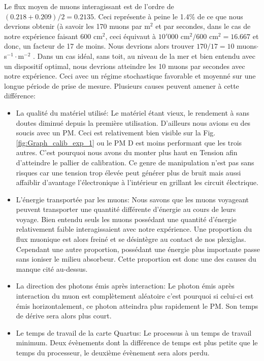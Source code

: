 \documentclass[12pt]{article}
\begin{document}
Le flux moyen de muons interagissant est de l'ordre de $(0.218+0.209)/2=0.2135$. Ceci représente à peine le 1.4\% de ce que nous devrions obtenir (à savoir les 170 muons par m$^2$ et par secondes, dans le cas de notre expérience faisant 600 cm$^{2}$, ceci équivaut à $10'000$ cm$^{2}/600$ cm$^{2}=16.667$ et donc, un facteur de 17 de moins. Nous devrions alors trouver $170/17=10$ muons$\cdot$ s$^{-1}\cdot $m$^{-2}$ . Dans un cas idéal, sans toit, au niveau de la mer et bien entendu avec un dispositif optimal, nous devrions atteindre les 10 muons par secondes avec notre expérience. Ceci avec un régime stochastique favorable et moyenné sur une longue période de prise de mesure. Plusieurs causes peuvent amener à cette différence: 

\begin{itemize}
    \item La qualité du matériel utilisé: Le matériel étant vieux, le rendement à sans doutes diminué depuis la première utilisation. D'ailleurs nous avions eu des soucis avec un PM. Ceci est relativement bien visible sur la Fig. \ref{fig:Graph_calib_exp_1} ou le PM D est moins performant que les trois autres. C'est pourquoi nous avons du monter plus haut en Tension afin d'atteindre le pallier de calibration. Ce genre de manipulation n'est pas sans risques car une tension trop élevée peut générer plus de bruit mais aussi affaiblir d'avantage l'électronique à l'intérieur en grillant les circuit électrique.
    
    \item L'énergie transportée par les muons: Nous savons que les muons voyageant peuvent transporter une quantité différente d'énergie au cours de leurs voyage. Bien entendu seuls les muons possédant une quantité d'énergie relativement faible interagissaient avec notre expérience. Une proportion du flux muonique est alors freiné et se désintègre au contact de nos plexiglas. Cependant une autre proportion, possédant une énergie plus importante passe sans ioniser le milieu absorbeur. Cette proportion est donc une des causes du manque cité au-dessus.
    
    \item La direction des photons émis après interaction: Le photon émis après interaction du muon est complètement aléatoire c'est pourquoi si celui-ci est émis horizontalement, ce photon atteindra plus rapidement le PM. Son temps de dérive sera alors plus court. 
    
    \item Le temps de travail de la carte Quartus: Le processus à un temps de travail minimum. Deux évènements dont la différence de temps est plus petite que le temps du processeur, le deuxième évènement sera alors perdu.
\end{itemize}
\end{document}

